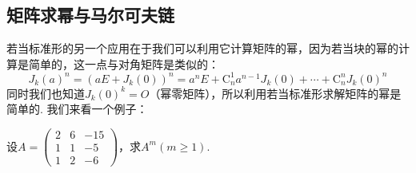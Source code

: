 \subsection{矩阵求幂与马尔可夫链}

若当标准形的另一个应用在于我们可以利用它计算矩阵的幂，因为若当块的幂的计算是简单的，这一点与对角矩阵是类似的：
\[J_k(a)^n=(aE+J_k(0))^n=a^nE+\mathrm{C}_n^1a^{n-1}J_k(0)+\cdots+\mathrm{C}_n^nJ_k(0)^n\]
同时我们也知道$J_k(0)^k=O$（幂零矩阵），所以利用若当标准形求解矩阵的幂是简单的. 我们来看一个例子：
\begin{example}
    设$A=\begin{pmatrix}
        2 & 6 & -15 \\ 1 & 1 & -5 \\ 1 & 2 & -6
    \end{pmatrix}$，求$A^{m}(m\geqslant 1)$.
\end{example}
\begin{solution}

\end{solution}

